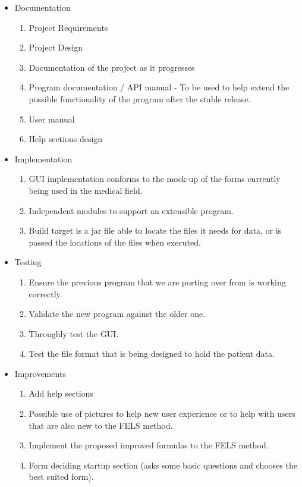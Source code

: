 \documentclass[12pt,letterpaper]{article}
\begin{document}
\begin{itemize}

\item Documentation
	\begin{enumerate}

	\item Project Requirements
	\item Project Design
	\item Documentation of the project as it progresses
	\item Program documentation / API manual - To be used to help extend the possible functionality of the program after the stable release.

	\item User manual
	\item Help sections design

	\end{enumerate}

\item Implementation
	\begin{enumerate}

	\item GUI implementation conforms to the mock-up of the forms currently being used in the medical field.
	\item Independent modules to support an extensible program.
	\item Build target is a jar file able to locate the files it needs for data, or is passed the locations of the files when executed.

	\end{enumerate}
\item Testing
	\begin{enumerate}
	
	\item Ensure the previous program that we are porting over from is working correctly.
	\item Validate the new program against the older one.
	\item Throughly test the GUI.
	\item Test the file format that is being designed to hold the patient data.

	\end{enumerate}
\item Improvements
	\begin{enumerate}
	
	\item Add help sections
	\item Possible use of pictures to help new user experience or to help with users that are also new to the FELS method.
	\item Implement the proposed improved formulas to the FELS method.
	\item Form deciding startup section (asks some basic questions and chooses the best suited form).

	\end{enumerate}

\end{itemize}
\end{document}
